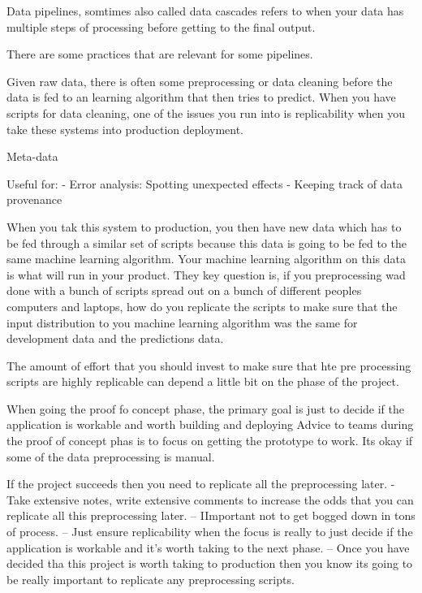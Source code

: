 Data pipelines, somtimes also called data cascades refers to when your data has multiple steps of processing before getting to the final output.

There are some practices that are relevant for some pipelines.

Given raw data, there is often some preprocessing or data cleaning before the data is fed to an learning algorithm that then tries to predict.
When you have scripts for data cleaning, one of the issues you run into is replicability when you take these systems into production deployment.

Meta-data

Useful for:
- Error analysis: Spotting unexpected effects
- Keeping track of data provenance

When you tak this system to production, you then have new data which has to be fed through a similar set of scripts because this data is going to be fed to the same machine learning algorithm.
Your machine learning algorithm on this data is what will run in  your product.
They key question is, if you preprocessing wad done with a bunch of scripts spread out on a bunch of different peoples computers and laptops, how do you replicate the scripts to make sure that the input distribution to you machine learning algorithm was the same for development data and the predictions data.


The amount of effort that you should invest to make sure that hte pre processing scripts are highly replicable can depend a little bit on the phase of the project.

When going the proof fo concept phase, the primary goal is just to decide if the application is workable and worth building and deploying
Advice to teams during the proof of concept phas is to focus on getting the prototype to work.
Its okay if some of the data preprocessing is manual.

If the project succeeds then you need to replicate all the preprocessing later.
- Take extensive notes, write extensive comments to increase the odds that you can replicate all this preprocessing later.
-- IImportant not to get bogged down in tons of process.
-- Just ensure replicability when the focus is really to just decide if the application is workable and it's worth taking to the next phase.
-- Once you have decided tha this project is worth taking to production then you know its going to be really important to replicate any preprocessing scripts.



